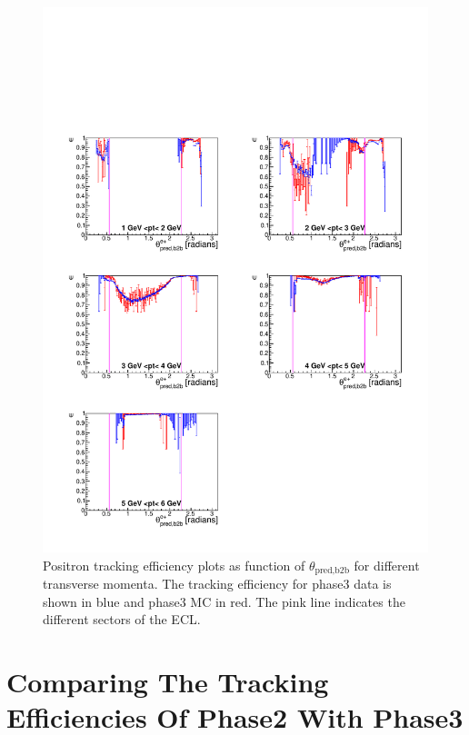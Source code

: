 \documentclass[a4paper,11pt,twosided,final,german,openbib,pdftex,listof=totoc,bibliography=totoc]{scrbook}
\begin{document}
\begin{figure}[!htbp]
	\centering
	\includegraphics[width=\textwidth]{Plots/master3/xPtMThetaepP3}
	\caption[Transverse Momentum $\theta_{\textrm{pred,b2b}}$ Positron Efficiency Phase3]{Positron tracking efficiency plots as function of $\theta_{\textrm{pred,b2b}}$ for different transverse momenta. The tracking efficiency for phase3 data is shown in blue and phase3 MC in red. The pink line indicates the different sectors of the ECL.}
	\label{plt:xPtMThetaep3}
\end{figure}


\clearpage




\chapter{Comparing The Tracking Efficiencies Of Phase2 With Phase3}
\label{cha:Comp}
\end{document}
